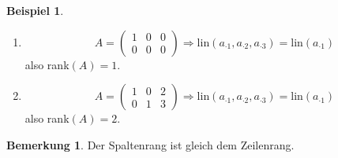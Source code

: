 \documentclass[a4paper,12pt]{article}
\theoremstyle{definition}
\newtheorem*{example}{Beispiel}
\newtheorem*{bemerkung}{Bemerkung}
\begin{document}
	\begin{example}
		\begin{enumerate}[label=(\arabic*)]
			\item 
			\[
				A = \begin{pmatrix}
					1 & 0 & 0\\
					0 & 0 & 0
				\end{pmatrix}
				\Longrightarrow\text{lin}(a_{\cdot 1}, a_{\cdot 2}, a_{\cdot 3}) = \text{lin}(a_{\cdot 1})
			\]
			also rank$(A) = 1$.
			\item 
			\[
				A = \begin{pmatrix}
					1 & 0 & 2\\
					0 & 1 & 3
				\end{pmatrix}
				\Longrightarrow\text{lin}(a_{\cdot 1}, a_{\cdot 2}, a_{\cdot 3}) = \text{lin}(a_{\cdot 1})
			\]
			also rank$(A) = 2$.
		\end{enumerate}
	\end{example}
	\begin{bemerkung}
		Der Spaltenrang ist gleich dem Zeilenrang.
	\end{bemerkung}
\end{document}
